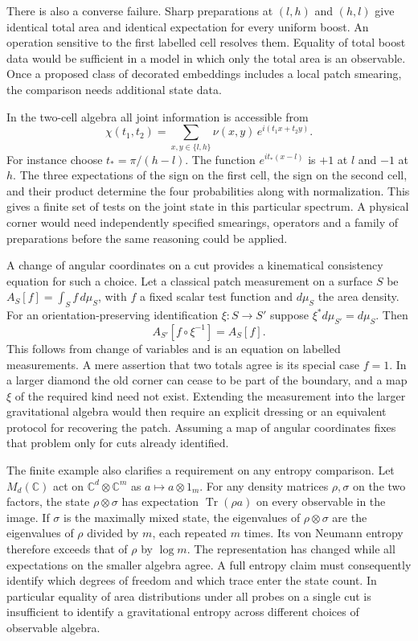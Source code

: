 \documentclass[11pt,letterpaper]{article}
\newcommand{\CC}{\mathbb C}
\begin{document}
There is also a converse failure. Sharp preparations at $(l,h)$ and $(h,l)$ give identical
total area and identical expectation for every uniform boost. An operation sensitive to the
first labelled cell resolves them. Equality of total boost data would be sufficient in a model
in which only the total area is an observable. Once a proposed class of decorated embeddings
includes a local patch smearing, the comparison needs additional state data.

In the two-cell algebra all joint information is accessible from
\[
 \chi(t_1,t_2)=
 \sum_{x,y\in\{l,h\}}\nu(x,y)\,e^{i(t_1x+t_2y)} .
\]
For instance choose $t_*=\pi/(h-l)$. The function $e^{it_*(x-l)}$ is $+1$ at $l$ and $-1$ at
$h$. The three expectations of the sign on the first cell, the sign on the second cell, and
their product determine the four probabilities along with normalization. This gives a finite
set of tests on the joint state in this particular spectrum. A physical corner would need
independently specified smearings, operators and a family of preparations before the same
reasoning could be applied.

A change of angular coordinates on a cut provides a kinematical consistency equation for such a
choice. Let a classical patch measurement on a surface $S$ be $A_S[f]=\int_S f\,d\mu_S$, with
$f$ a fixed scalar test function and $d\mu_S$ the area density. For an orientation-preserving
identification $\xi:S\to S'$ suppose $\xi^*d\mu_{S'}=d\mu_S$. Then
\[
 A_{S'}[f\circ\xi^{-1}]=A_S[f] .
\]
This follows from change of variables and is an equation on labelled measurements. A mere
assertion that two totals agree is its special case $f=1$. In a larger diamond the old corner
can cease to be part of the boundary, and a map $\xi$ of the required kind need not exist.
Extending the measurement into the larger gravitational algebra would then require an explicit
dressing or an equivalent protocol for recovering the patch. Assuming a map of angular
coordinates fixes that problem only for cuts already identified.

The finite example also clarifies a requirement on any entropy comparison. Let $M_d(\CC)$ act
on $\CC^d\otimes\CC^m$ as $a\mapsto a\otimes 1_m$. For any density matrices $\rho,\sigma$ on
the two factors, the state $\rho\otimes\sigma$ has expectation $\operatorname{Tr}(\rho a)$ on
every observable in the image. If $\sigma$ is the maximally mixed state, the eigenvalues of
$\rho\otimes\sigma$ are the eigenvalues of $\rho$ divided by $m$, each repeated $m$ times. Its
von Neumann entropy therefore exceeds that of $\rho$ by $\log m$. The representation has
changed while all expectations on the smaller algebra agree. A full entropy claim must
consequently identify which degrees of freedom and which trace enter the state count. In
particular equality of area distributions under all probes on a single cut is insufficient to
identify a gravitational entropy across different choices of observable algebra.
\end{document}
